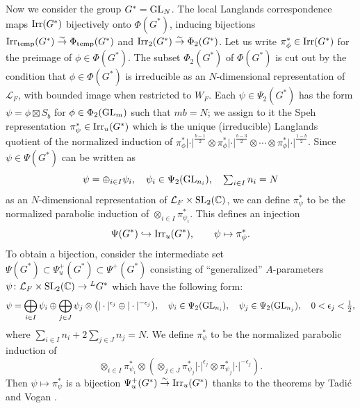 \documentclass[11pt,reqno]{amsart}
\theoremstyle{plain}
\theoremstyle{definition}
\newcommand{\C}{\mathbb{C}}
\renewcommand{\cL}{\mathcal{L}}
\newcommand{\temp}{\tu{temp}}
\newcommand{\SL}{\tu{SL}}
\newcommand{\GL}{\tu{GL}}
\newcommand{\Irr}{\tu{Irr}}
\newcommand{\tu}{\textup}
\newcommand{\ra}{\rightarrow}
\newcommand{\isom}{\stackrel{\sim}{\ra}}
\numberwithin{equation}{subsection}
\begin{document}
Now we consider the group $G^*=\GL_N$. The local Langlands correspondence \cite{HT01,Hen00,Lan89} maps $\Irr(G^*)$ bijectively onto $\Phi(G^*)$, inducing bijections $\Irr_{\temp}(G^*)\isom \Phi_{\temp}(G^*)$ and $\Irr_2(G^*)\isom \Phi_2(G^*)$. Let us write $\pi^*_\phi\in \Irr(G^*)$ for the preimage of $\phi\in \Phi(G^*)$. The subset $\Phi_2(G^*)$ of $\Phi(G^*)$ is cut out by the condition that $\phi\in \Phi(G^*)$ is irreducible as an $N$-dimensional representation of $\cL_F$, with bounded image when restricted to $W_F$. 
Each $\psi\in \Psi_2(G^*)$ has the form $\psi=\phi\boxtimes S_b$ for $\phi\in \Phi_2(\GL_m)$ such that $mb=N$; we assign to it the Speh representation $\pi^*_\psi\in \Irr_u(G^*)$ which is the unique (irreducible) Langlands quotient of the normalized induction of $\pi^*_{\phi}|\cdot|^{\frac{b-1}{2}}\otimes \pi^*_{\phi}|\cdot|^{\frac{b-3}{2}}\otimes \cdots \otimes \pi^*_{\phi}|\cdot|^{\frac{1-b}{2}}$. Since $\psi\in \Psi(G^*)$ can be written as 
\[
\psi=\oplus_{i\in I} \psi_i,\quad \psi_i\in \Psi_2(\GL_{n_i}),\quad \textstyle\sum_{i\in I} n_i=N
\]
as an $N$-dimensional representation of $\mathcal L_F\times \SL_2(\C)$,
we can define $\pi^*_\psi$ to be the normalized parabolic induction of $\otimes_{i\in I} \pi^*_{\psi_i}$. This defines an injection
\begin{equation}\label{eq:A-packet-GLn}
    \Psi(G^*)\hookrightarrow \Irr_u(G^*),\qquad \psi\mapsto \pi^*_{\psi}.
\end{equation}
To obtain a bijection, consider the intermediate set  $\Psi(G^*)\subset \Psi^+_u(G^*)\subset \Psi^+(G^*)$ consisting of ``generalized'' $A$-parameters $\psi\colon \mathcal L_F\times \SL_2(\C)\to {}^L G^*$ which have the following form:
\begin{equation}\label{eq:psi-decomposition}
\psi=\bigoplus_{i\in I} \psi_i \oplus \bigoplus_{j\in J} \psi_j\otimes \big(|\cdot|^{\epsilon_j}\oplus |\cdot|^{-\epsilon_j}\big),\quad \psi_i\in \Psi_2(\GL_{n_i}), \quad \psi_j\in \Psi_2(\GL_{n_j}), \quad 0<\epsilon_j<\tfrac{1}{2},
\end{equation}
where $\sum_{i\in I}n_i+2\sum_{j\in J}n_j=N$. We define $\pi^*_{\psi}$ to be the normalized parabolic induction of 
\[\otimes_{i\in I}\pi^*_{\psi_i}\otimes (\otimes_{j\in J}\pi^*_{\psi_j}|\cdot|^{\epsilon_j}\otimes \pi^*_{\psi_j}|\cdot|^{-\epsilon_j}).
\]
Then $\psi\mapsto \pi^*_{\psi}$ is a bijection $\Psi^+_u(G^*)\isom \Irr_u(G^*)$ thanks to the theorems by Tadi\'c and Vogan \cite{TadicUnitaryDual,VoganUnitaryDual}. 
\end{document}
